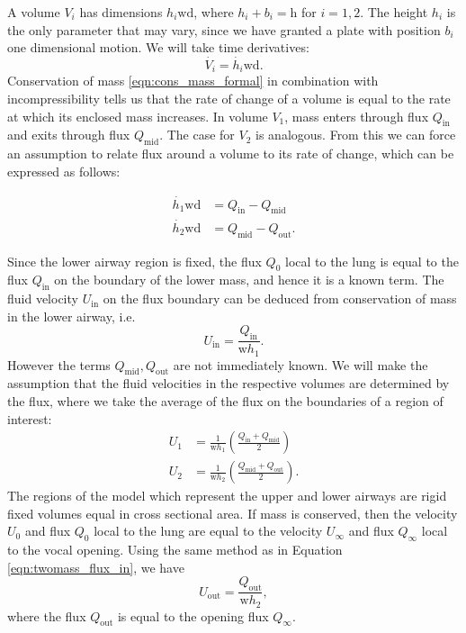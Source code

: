 \documentclass{report}
\begin{document}
A volume $V_i$ has dimensions $h_i \mathrm{wd}$, where $h_i + b_i = \mathrm{h}$ for $i=1,2$.
The height $h_i$ is the only parameter that may vary, since we have granted a plate with position $b_i$ one dimensional motion.
We will take time derivatives:
\begin{equation}
    \dot{V_i} = \dot{h_i} \mathrm{wd}.
\end{equation}
Conservation of mass \ref{eqn:cons_mass_formal} in combination with incompressibility tells us that the rate of change of a volume is equal to the rate at which its enclosed mass increases.
In volume $V_1$, mass enters through flux $Q_\mathrm{in}$ and exits through flux $Q_\mathrm{mid}$. The case for $V_2$ is analogous.
From this we can force an assumption to relate flux around a volume to its rate of change, which can be expressed as follows:

\begin{equation}
    \begin{aligned}
        \dot{h_1} \mathrm{w d} &= Q_\mathrm{in} - Q_\mathrm{mid} \\
        \dot{h_2} \mathrm{w d} &= Q_\mathrm{mid} - Q_\mathrm{out}.
    \end{aligned}
    \label{eqn:twomass_flux_motion}
\end{equation}

Since the lower airway region is fixed,
the flux $Q_0$ local to the lung is equal to the flux $Q_\mathrm{in}$ on the boundary of the lower mass,
and hence it is a known term. The fluid velocity $U_\mathrm{in}$ on the flux boundary can be deduced from conservation of mass in the lower airway, i.e.
\begin{equation}
    U_\mathrm{in} = \frac{Q_\mathrm{in}}{\mathrm{w}h_1}.
    \label{eqn:twomass_flux_in}
\end{equation}
However the terms $Q_\mathrm{mid}, Q_\mathrm{out}$ are not immediately known.
We will make the assumption that the fluid velocities in the respective volumes are determined by the flux,
where we take the average of the flux on the boundaries of a region of interest:
\begin{equation}
    \begin{aligned}
        U_1 &= \frac{1}{\mathrm{w}h_1}\left(\frac{Q_\mathrm{in} + Q_\mathrm{mid}}{2}\right) \\
        U_2 &= \frac{1}{\mathrm{w}h_2}\left(\frac{Q_\mathrm{mid} + Q_\mathrm{out}}{2}\right).
        \label{eqn:twomass_velocity_interpolation}
    \end{aligned}
\end{equation}
The regions of the model which represent the upper and lower airways are rigid fixed volumes equal in cross sectional area.
If mass is conserved, then the velocity $U_0$ and flux $Q_0$ local to the lung are equal to the velocity $U_\infty$ and flux $Q_\infty$ local to the vocal opening.
Using the same method as in Equation \ref{eqn:twomass_flux_in}, we have
\begin{equation}
    U_\mathrm{out} = \frac{Q_\mathrm{out}}{\mathrm{w}h_2},
    \label{eqn:twomass_flux_out}
\end{equation}
where the flux $Q_\mathrm{out}$ is equal to the opening flux $Q_\mathrm{\infty}$.
\end{document}

